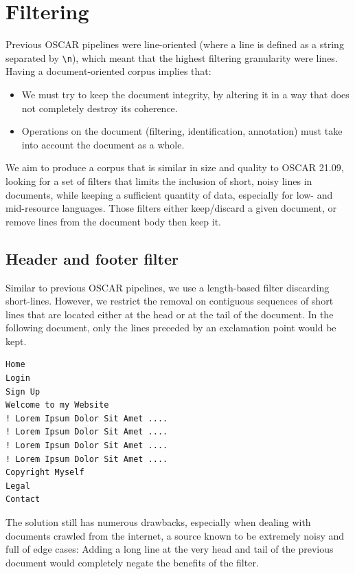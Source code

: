 \section{Filtering}

Previous OSCAR pipelines were line-oriented (where a line is defined as a string separated by \texttt{\textbackslash n}), which meant that the highest filtering granularity were lines.
Having a document-oriented corpus implies that:
\begin{itemize}
    \item We must try to keep the document integrity, by altering it in a way that does not completely destroy its coherence.
    \item Operations on the document (filtering, identification, annotation) must take into account the document as a whole.
\end{itemize}

We aim to produce a corpus that is similar in size and quality to OSCAR 21.09, looking for a set of filters that limits the inclusion of short, noisy lines in documents, while keeping a sufficient quantity of data, especially for low- and mid-resource languages. Those filters either keep/discard a given document, or remove lines from the document body then keep it.

\subsection {Header and footer filter}

Similar to previous OSCAR pipelines, we use a length-based filter discarding short-lines. However, we restrict the removal on contiguous sequences of short lines that are located either at the head or at the tail of the document. In the following document, only the lines preceded by an exclamation point would be kept.

\begin{verbatim}
Home
Login
Sign Up
Welcome to my Website
! Lorem Ipsum Dolor Sit Amet ....
! Lorem Ipsum Dolor Sit Amet ....
! Lorem Ipsum Dolor Sit Amet ....
! Lorem Ipsum Dolor Sit Amet ....
Copyright Myself
Legal
Contact
\end{verbatim}

The solution still has numerous drawbacks, especially when dealing with documents crawled from the internet, a source known to be extremely noisy and full of edge cases: Adding a long line at the very head and tail of the previous document would completely negate the benefits of the filter.

